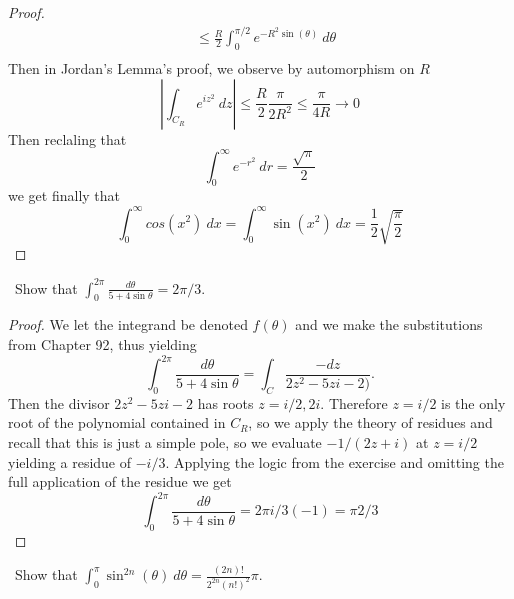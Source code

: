 \documentclass[11pt]{amsart}
\theoremstyle{definition}
\numberwithin{theorem}{section}
\numberwithin{definition}{section}
\numberwithin{equation}{section}
\begin{document}
\begin{proof}
\begin{equation*}
\begin{aligned}
		&\leq \frac{R}{2} \int_0^{\pi/2} e^{ -R^2 \sin(\theta)}\ d\theta \\
	\end{aligned}
	\end{equation*}
	Then in Jordan's Lemma's proof, we observe by automorphism on $R$ 
	\begin{equation*}
		\left|\int_{C_R} e^{iz^2}\ dz \right| \leq \frac{R}{2} \frac{\pi}{2R^2} \leq \frac{\pi}{4R} \to 0
	\end{equation*}
	Then reclaling that
	\begin{equation*}
		\int_0^\infty e^{-r^2}\ dr = \frac{{\sqrt{\pi}}}{2}
	\end{equation*}
	we get finally that
	\begin{equation*}
			\int_0^\infty cos(x^2)\ dx = \int_0^\infty \sin(x^2)\ dx = \frac{1}{2} \sqrt{\frac{\pi}{2}}
	\end{equation*}


\end{proof}
\medskip {}\ Show that $\int_0^{2\pi} \frac{d\theta}{5 + 4 \sin \theta} = 2\pi/3.$
\begin{proof}
	We let the integrand be denoted $f(\theta)$ and we make the substitutions from Chapter 92, thus yielding
	\begin{equation*}
		\int_0^{2\pi} \frac{d\theta}{5 + 4 \sin \theta} = \int_C \frac{-dz}{2z^2 -5zi- 2)}.
	\end{equation*}
	Then the divisor $2z^2 - 5zi - 2$ has roots $z = i/2, 2i$.
	Therefore $z= i/2$ is the only root of the polynomial contained in $C_R$, so we
	apply the theory of residues and recall that this is just a simple pole, so we evaluate $-1/(2z + i)$ at $z =  i/2$ yielding a residue of $-i/3$. Applying the logic from the exercise and omitting the full application of the residue we get
	\begin{equation*}
		\int_0^{2\pi} \frac{d\theta}{5 + 4 \sin \theta} = 2\pi i/3 (-1) = \pi2/3
	\end{equation*}
\end{proof}
\medskip {}\ Show that $\int_0^\pi \sin^{2n}(\theta)\ d\theta = \frac{(2n)!}{2^{2n}(n!)^2} \pi$.
\end{document}
